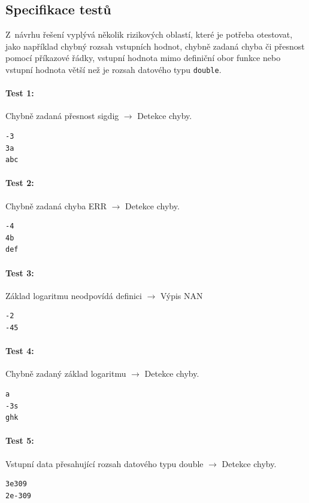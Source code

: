 \documentclass[12pt,a4paper,titlepage,final]{article}
\begin{document}
\subsection{Specifikace testů} \label{testy}

Z~návrhu řešení vyplývá několik rizikových oblastí, které je potřeba otestovat,
jako například chybný rozsah vstupních hodnot, chybně zadaná chyba či přesnost
pomocí příkazové řádky, vstupní hodnota mimo definiční obor funkce nebo vstupní
hodnota větší než je rozsah datového typu \texttt{double}.

\paragraph{Test 1:} Chybně zadaná přesnost sigdig $\longrightarrow$ Detekce chyby.
\begin{verbatim}
-3
3a
abc
\end{verbatim} 

\paragraph{Test 2:} Chybně zadaná chyba ERR $\longrightarrow$ Detekce chyby.
\begin{verbatim}
-4
4b
def
\end{verbatim} 

\paragraph{Test 3:} Základ logaritmu neodpovídá definici $\longrightarrow$ Výpis
NAN
\begin{verbatim}
-2
-45
\end{verbatim} 

\paragraph{Test 4:} Chybně zadaný základ logaritmu $\longrightarrow$ Detekce
chyby.
\begin{verbatim}
a
-3s
ghk
\end{verbatim}

\paragraph{Test 5:} Vstupní data přesahující rozsah datového typu double
$\longrightarrow$ Detekce chyby.
\begin{verbatim}
3e309
2e-309
\end{verbatim}
\end{document}
